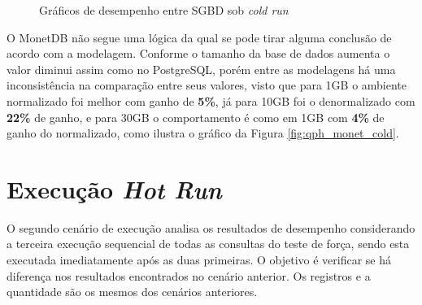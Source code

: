 \begin{figure}[htpb]
        \centering
        \caption{Gráficos de desempenho entre SGBD sob \textit{cold run}}
        \label{fig:qph_sgbd_cold}
\end{figure}

O MonetDB não segue uma lógica da qual se pode tirar alguma conclusão de acordo com a modelagem. Conforme o tamanho da base de dados aumenta o valor diminui assim como no PostgreSQL, porém entre as modelagens há uma inconsistência na comparação entre seus valores, visto que para 1GB o ambiente normalizado foi melhor com ganho de \textbf{5\%}, já para 10GB foi o denormalizado com \textbf{22\%} de ganho, e para 30GB o comportamento é como em 1GB com \textbf{4\%} de ganho do normalizado, como ilustra o gráfico da Figura \ref{fig:qph_monet_cold}. 


\section{Execução \textit{Hot Run}}

O segundo cenário de execução analisa os resultados de desempenho considerando a terceira execução sequencial de todas as consultas do teste de força, sendo esta executada imediatamente após as duas primeiras. O objetivo é verificar se há diferença nos resultados encontrados no cenário anterior. Os registros e a quantidade são os mesmos dos cenários anteriores. 

